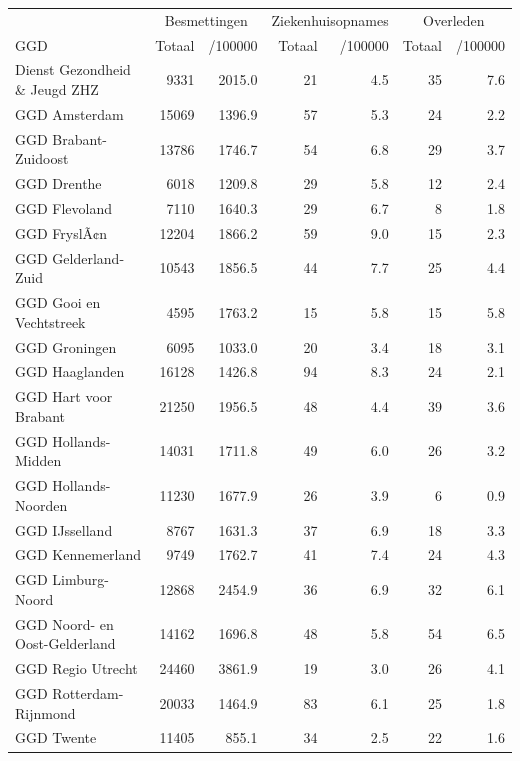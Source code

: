 \documentclass[
  english,
  man,floatsintext]{apa6}
\begin{document}
\begin{table}
\centering\begingroup\fontsize{10}{12}\selectfont

\begin{threeparttable}
\begin{tabular}{lrrrrrr}
\toprule
\multicolumn{1}{c}{ } & \multicolumn{2}{c}{Besmettingen} & \multicolumn{2}{c}{Ziekenhuisopnames} & \multicolumn{2}{c}{Overleden} \\
\cmidrule(l{3pt}r{3pt}){2-3} \cmidrule(l{3pt}r{3pt}){4-5} \cmidrule(l{3pt}r{3pt}){6-7}
GGD & Totaal & /100000 & Totaal & /100000 & Totaal & /100000\\
\midrule
Dienst Gezondheid \& Jeugd ZHZ & 9331 & 2015.0 & 21 & 4.5 & 35 & 7.6\\
GGD Amsterdam & 15069 & 1396.9 & 57 & 5.3 & 24 & 2.2\\
GGD Brabant-Zuidoost & 13786 & 1746.7 & 54 & 6.8 & 29 & 3.7\\
GGD Drenthe & 6018 & 1209.8 & 29 & 5.8 & 12 & 2.4\\
GGD Flevoland & 7110 & 1640.3 & 29 & 6.7 & 8 & 1.8\\
GGD FryslÃ¢n & 12204 & 1866.2 & 59 & 9.0 & 15 & 2.3\\
GGD Gelderland-Zuid & 10543 & 1856.5 & 44 & 7.7 & 25 & 4.4\\
GGD Gooi en Vechtstreek & 4595 & 1763.2 & 15 & 5.8 & 15 & 5.8\\
GGD Groningen & 6095 & 1033.0 & 20 & 3.4 & 18 & 3.1\\
GGD Haaglanden & 16128 & 1426.8 & 94 & 8.3 & 24 & 2.1\\
GGD Hart voor Brabant & 21250 & 1956.5 & 48 & 4.4 & 39 & 3.6\\
GGD Hollands-Midden & 14031 & 1711.8 & 49 & 6.0 & 26 & 3.2\\
GGD Hollands-Noorden & 11230 & 1677.9 & 26 & 3.9 & 6 & 0.9\\
GGD IJsselland & 8767 & 1631.3 & 37 & 6.9 & 18 & 3.3\\
GGD Kennemerland & 9749 & 1762.7 & 41 & 7.4 & 24 & 4.3\\
GGD Limburg-Noord & 12868 & 2454.9 & 36 & 6.9 & 32 & 6.1\\
GGD Noord- en Oost-Gelderland & 14162 & 1696.8 & 48 & 5.8 & 54 & 6.5\\
GGD Regio Utrecht & 24460 & 3861.9 & 19 & 3.0 & 26 & 4.1\\
GGD Rotterdam-Rijnmond & 20033 & 1464.9 & 83 & 6.1 & 25 & 1.8\\
GGD Twente & 11405 & 855.1 & 34 & 2.5 & 22 & 1.6\\

\end{tabular}
\end{threeparttable}
\end{table}
\end{document}
